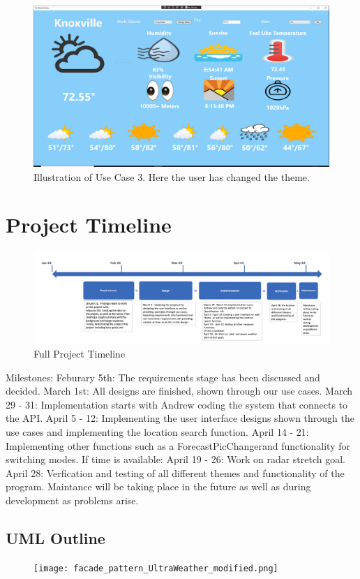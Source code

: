 \documentclass[10pt,conference,onecolumn,compsoc]{IEEEtran}
\begin{document}
\begin{figure}[ht!]
\includegraphics[scale=0.1]{use_case_3.png}
\caption{Illustration of Use Case 3. Here the user has changed the theme.}
\label{use_case_3}
\end{figure}


\section{Project Timeline}
\begin{figure}[ht !]
\includegraphics[scale = 0.3]{Timeline.png}
\caption{Full Project Timeline}
\label{TimeLine}
\end{figure}
Milestones:
Feburary 5th: The requirements stage has been discussed and decided.
March 1st: All designs are finished, shown through our use cases.
March 29 - 31: Implementation starts with Andrew coding the system that connects to the API.
April 5 - 12: Implementing the user interface designs shown through the use cases and implementing the location search function.
April 14 - 21: Implementing other functions such as a ForecastPicChangerand functionality for switching modes.
If time is available:
April 19 - 26: Work on radar stretch goal.
April 28: Verfication and testing of all different themes and functionality of the program.
Maintance will be taking place in the future as well as during development as problems arise.

\subsection{UML Outline}
\begin{figure}[ht!]
\texttt{[image: facade\_pattern\_UltraWeather\_modified.png]}
\end{figure}
\end{document}
